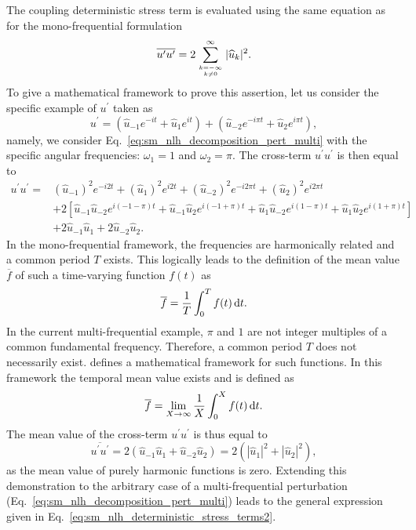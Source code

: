 The coupling deterministic stress term is evaluated using the
same equation as for the mono-frequential formulation
\begin{equation}
	\overline{u^\prime u^\prime} = 
	2 \sum_{\genfrac{}{}{0pt}{}{k=-\infty}{k \neq 0}}^{\infty} |\widehat{u}_k|^2.
	\label{eq:sm_nlh_deterministic_stress_terms2}
\end{equation}
To give a mathematical framework to prove this assertion, 
let us consider the specific example of $u^\prime$ taken as
\begin{equation}
	u^\prime = (\widehat{u}_{-1} e^{-i t} + \widehat{u}_{1} e^{i t}) +
		(\widehat{u}_{-2} e^{-i \pi t} + \widehat{u}_{2} e^{i \pi t}),
\end{equation}
namely, we consider Eq.~\eqref{eq:sm_nlh_decomposition_pert_multi}
with the specific angular frequencies: $\omega_1 = 1$ and $\omega_2 = \pi$.
The cross-term $u^\prime u^\prime$ is then equal to
\begin{equation}
	\begin{split}
		u^\prime u^\prime = 
			&(\widehat{u}_{-1})^2 e^{-i 2 t}
			+ (\widehat{u}_{1})^2 e^{i 2 t}
			+ (\widehat{u}_{-2})^2 e^{- i 2 \pi t}
			+ (\widehat{u}_{2})^2 e^{i 2 \pi t} \\
		&+ 2 \left[
				\widehat{u}_{-1} \widehat{u}_{-2} e^{i (-1 -\pi) t} 
				+ \widehat{u}_{-1} \widehat{u}_{2} e^{i (-1 + \pi) t}
				+ \widehat{u}_{1} \widehat{u}_{-2} e^{i (1 - \pi) t} 
				+ \widehat{u}_{1} \widehat{u}_{2} e^{i (1 + \pi) t} 
			 \right] \\
		&+ 2 \widehat{u}_{-1}\widehat{u}_{1}
			 	+ 2 \widehat{u}_{-2}\widehat{u}_{2}.
	\end{split}
\end{equation}
In the mono-frequential framework, the frequencies are harmonically related
and a common period $T$ exists. This logically leads to the definition
of the mean value $\overline{f}$ of such a time-varying function $f(t)$ as
\begin{equation}
	\overline{f} = \frac{1}{T} \int_0^T f(t) \mathop{}\!\mathrm{d} t.
\end{equation}
In the current multi-frequential example, 
$\pi$ and $1$ are not integer multiples of a common fundamental
frequency. Therefore, a common period $T$ does
not necessarily exist. \citet{Besicovitch1932}
defines a mathematical framework for such functions. In this framework
the temporal mean value exists and is defined as
\begin{equation}
	\overline{f} = \lim_{X \to \infty} \frac{1}{X} \int_0^X f(t) \mathop{}\!\mathrm{d} t.
\end{equation}
The mean value of the cross-term $u^\prime u^\prime$ is thus equal to
\begin{equation}
	\overline{u^\prime u^\prime} = 2 (\widehat{u}_{-1}\widehat{u}_{1} + 
		\widehat{u}_{-2}\widehat{u}_{2}) = 2 (|\widehat{u}_1|^2 + |\widehat{u}_2|^2),
\end{equation}
as the mean value of purely harmonic functions is zero.
Extending this demonstration to the arbitrary case of a
multi-frequential perturbation 
(Eq.~\eqref{eq:sm_nlh_decomposition_pert_multi}) leads to
the general expression given in Eq.~\eqref{eq:sm_nlh_deterministic_stress_terms2}.


